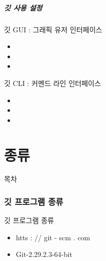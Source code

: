 \documentclass[aspectratio=1610,20pt,xcolor=pdftex,dvipsnames,table,handout]{beamer}
\begin{document}
		\begin{frame} [t,plain]
		\frametitle{깃 사용 설정}

			\begin{block} {깃 GUI : 그래픽 유저 인터페이스}
			\setlength{\leftmargini}{2em}			
			\begin{itemize}
				\item 
				\item 
				\item 
			\end{itemize}
			\end{block}						

			\begin{block} {깃 CLI : 커멘드 라인 인터페이스 }
			\setlength{\leftmargini}{2em}			
			\begin{itemize}
				\item 
				\item 
				\item 
			\end{itemize}
			\end{block}						

		\end{frame}			




		\part{종류 }
		\frame{\partpage}

\label{part1} 	%


		\begin{frame} [plain]{목차}
		\tableofcontents%
		\end{frame}


		\section{깃 프로그램 종류}


		\begin{frame} [t,plain]

			\begin{block} {깃 프로그램 종류}
			\setlength{\leftmargini}{2em}			
			\begin{itemize}
				\item htts : // git - scm .  com
				\item Git-2.29.2.3-64-bit 
			\end{itemize}
			\end{block}						

		\end{frame}						
\end{document}
